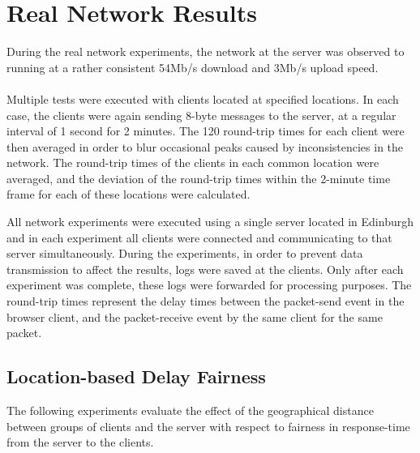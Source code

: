 \documentclass[bsc, 12pt, twoside, singlespacing, parskip, abbrevs, notimes, normalheadings, logo]{styles/infthesis}
\begin{document}
\section{Real Network Results}
During the real network experiments, the network at the server was observed to running at a rather consistent 54Mb/s download and 3Mb/s upload speed.

\paragraph*{}Multiple tests were executed with clients located at specified locations. In each case, the clients were again sending 8-byte messages to the server, at a regular interval of 1 second for 2 minutes. The 120 round-trip times for each client were then averaged in order to blur occasional peaks caused by inconsistencies in the network. The round-trip times of the clients in each common location were averaged, and the deviation of the round-trip times within the 2-minute time frame for each of these locations were calculated.

All network experiments were executed using a single server located in Edinburgh and in each experiment all clients were connected and communicating to that server simultaneously. During the experiments, in order to prevent data transmission to affect the results, logs were saved at the clients. Only after each experiment was complete, these logs were forwarded for processing purposes. The round-trip times represent the delay times between the packet-send event in the browser client, and the packet-receive event by the same client for the same packet.

\subsection{Location-based Delay Fairness}
The following experiments evaluate the effect of the geographical distance between groups of clients and the server with respect to fairness in response-time from the server to the clients.
\end{document}
